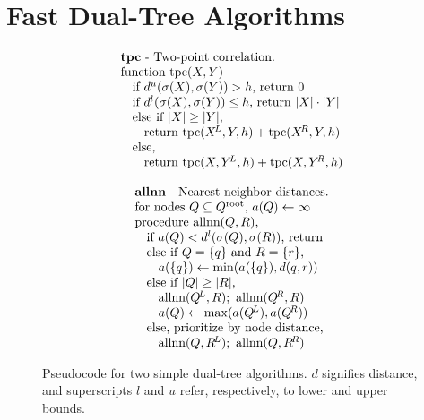 \documentclass[twoside,leqno,twocolumn]{article}
\newcommand{\psty}{}
\newcommand{\X}{\\ \psty}
\newcommand{\x}{\X \hspace{0.13in}}
\newcommand{\xx}{\X \hspace{0.26in}}
\newcommand{\kdroot}[1]{#1^{\text{root}}}
\newcommand{\kdleft}[1]{#1^{\!L}}
\newcommand{\kdright}[1]{#1^{\!R}}
\newcommand{\lo}[1]{#1^{l}}
\newcommand{\up}[1]{#1^{u}}
\newcommand{\distlo}{\lo{d}}
\newcommand{\distup}{\up{d}}
\newcommand{\dist}[2]{d(#1,#2)}
\newcommand{\outstat}{\sigma}
\begin{document}
\section{Fast Dual-Tree Algorithms}

\begin{figure}
  \begin{minipage}{6in}
    \begin{minipage}{2.5in}
      \begin{displaymath}
        \begin{array}[t]{l}
          \text{{\bf tpc} - Two-point correlation.}
          \X \text{function tpc}(X, Y)
          \x \text{if }\distup(\outstat(X), \outstat(Y)) > h\text{, return }0
          \x \text{if }\distlo(\outstat(X), \outstat(Y)) \leq h\text{, return } |X| \cdot |Y|
          \x \text{else if }|X| \geq |Y|\text{,}
          \xx \text{return tpc}(\kdleft{X}, Y, h) + \text{tpc}(\kdright{X}, Y, h)
          \x \text{else,}
          \xx \text{return tpc}(X, \kdleft{Y}, h) + \text{tpc}(X, \kdright{Y}, h)
        \end{array}
       \end{displaymath}
       \vspace{-.1in}
       \caption{\footnotesize \label{fig:allnntpc} Pseudocode for two simple dual-tree algorithms.
       $d$ signifies distance, and superscripts $l$ and $u$ refer, respectively, to lower and upper bounds.}
      \end{minipage}
      \begin{minipage}{3.0in}
       \begin{displaymath}
        \begin{array}[t]{l}
          \text{{\bf allnn} - Nearest-neighbor distances.}
          \X \text{for nodes }Q \subseteq \kdroot{Q}\text{, }a(Q) \gets \infty
          \X \text{procedure allnn}(Q,R)\text{,}
          \x \text{if }a(Q) < \distlo(\outstat(Q), \outstat(R))\text{, return}
          \x \text{else if }Q = \{q\} \text{ and } R = \{r\}\text{,}
          \xx a(\{q\}) \gets \min(a(\{q\}), \dist{q}{r})
          \x \text{else if }|Q| \geq |R|\text{,}
          \xx \text{allnn}(\kdleft{Q}, R); \text{ allnn}(\kdright{Q}, R)
          \xx a(Q) \gets \max(a(\kdleft{Q}), a(\kdright{Q}))
          \x \text{else, prioritize by node distance,}
          \xx \text{allnn}(Q, \kdleft{R}); \text{ allnn}(Q, \kdright{R})
        \end{array}
       \end{displaymath}
      \end{minipage}
  \end{minipage}
\end{figure}
\end{document}

